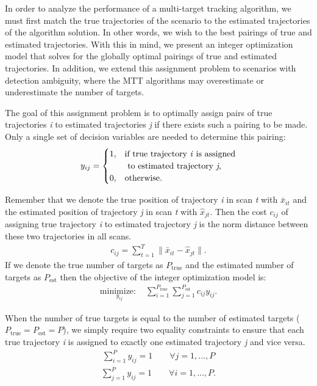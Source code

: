 In order to analyze the performance of a multi-target tracking algorithm, we must first match the true trajectories of the scenario to the estimated trajectories of the algorithm solution. In other words, we wish to the best pairings of true and estimated trajectories. With this in mind, we present an integer optimization model that solves for the globally optimal pairings of true and estimated trajectories. In addition, we extend this assignment problem to scenarios with detection ambiguity, where the MTT algorithms may overestimate or underestimate the number of targets.

The goal of this assignment problem is to optimally assign pairs of true trajectories \textit{i} to estimated trajectories \textit{j} if there exists such a pairing to be made. Only a single set of decision variables are needed to determine this pairing:
\[y_{ij} = 
\begin{cases}
1, & \text{if true trajectory \textit{i} is assigned}\\
    & \text{ to estimated trajectory \textit{j},}\\
0, & \text{otherwise.}
\end{cases}\]

Remember that we denote the true position of trajectory \textit{i} in scan \textit{t} with $\bar{x}_{it}$ and the estimated position of trajectory \textit{j} in scan \textit{t} with $\hat{x}_{jt}$. Then the cost $c_{ij}$ of assigning true trajectory \textit{i} to estimated trajectory \textit{j} is the norm distance between these two trajectories in all scans. 
\begin{align*}
	c_{ij} = \sum_{t=1}^{T} \|\bar{x}_{it} - \hat{x}_{jt}\|.
\end{align*}
If we denote the true number of targets as $P_{\text{true}}$ and the estimated number of targets as $P_{\text{est}}$ then the objective of the integer optimization model is:
\begin{align*}
\underset{y_{ij}}{\text{minimize: }} & \sum_{i=1}^{P_{\text{true}}} \sum_{j=1}^{P_{\text{est}}} c_{ij}y_{ij}.
\end{align*}

When the number of true targets is equal to the number of estimated targets ($P_{\text{true}} = P_{\text{est}} = P$), we simply require two equality constraints to ensure that each true trajectory \textit{i} is assigned to exactly one estimated trajectory \textit{j} and vice versa. 
\begin{align}\label{eqn:assignment_1}
\sum_{i=1}^{P} y_{ij} = 1 \qquad \forall j = 1,...,P
\end{align}
\begin{align}\label{eqn:assignment_2}
\sum_{j=1}^{P} y_{ij} = 1 \qquad \forall i = 1,...,P.
\end{align}

